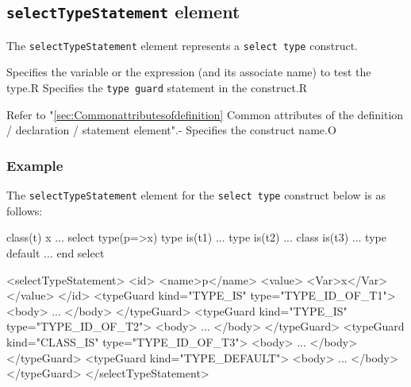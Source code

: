 \subsection{ {\tt selectTypeStatement} element}

The {\tt selectTypeStatement} element represents a {\tt select type} construct.


\begin{XcodeMLChildElements}
{Specifies the variable or the expression (and its associate name) to test the type.}{R}
{Specifies the {\tt type guard} statement in the construct.}{R}
\end{XcodeMLChildElements}

\begin{XcodeMLAttributes}
{Refer to "\ref{sec:Commonattributesofdefinition} Common attributes of the definition / declaration / statement element".}{-}
{Specifies the construct name.}{O}
\end{XcodeMLAttributes}

\subsubsection*{Example}

The {\tt selectTypeStatement} element for the {\tt select type} construct below is as follows:
\vspace{2mm}

\begin{Fexample2008}
class(t) x
...
select type(p=>x)
type is(t1)
  ...
type is(t2)
  ...
class is(t3)
  ...
type default
  ...
end select
\end{Fexample2008}
\vspace{1mm}

\begin{XcodeMLFExample}
<selectTypeStatement>
  <id>
    <name>p</name>
    <value>
       <Var>x</Var>
    </value>
  </id>
  <typeGuard kind="TYPE_IS" type="TYPE_ID_OF_T1">
    <body>
      ...
    </body>
  </typeGuard>
  <typeGuard kind="TYPE_IS" type="TYPE_ID_OF_T2">
    <body>
      ...
    </body>
  </typeGuard>
  <typeGuard kind="CLASS_IS" type="TYPE_ID_OF_T3">
    <body>
      ...
    </body>
  </typeGuard>
  <typeGuard kind="TYPE_DEFAULT">
    <body>
      ...
    </body>
  </typeGuard>
</selectTypeStatement>
\end{XcodeMLFExample}


